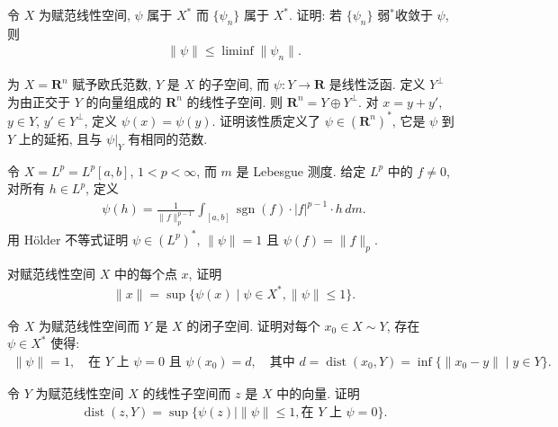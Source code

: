\documentclass[../../main.tex]{subfiles}
\begin{document}
\begin{exercise}\label{exercise:ch14-20}
令 $X$ 为赋范线性空间, $\psi$ 属于 $X^{*}$ 而 $\{\psi_{n}\}$ 属于 $X^{*}$. 证明: 若 $\{\psi_{n}\}$ 弱$^{*}$收敛于 $\psi$, 则
\begin{align*}
\|\psi\|\leqslant\liminf\|\psi_{n}\|.
\end{align*}
\end{exercise}

\begin{exercise}\label{exercise:ch14-21}
为 $X=\mathbf{R}^{n}$ 赋予欧氏范数, $Y$ 是 $X$ 的子空间, 而 $\psi:Y\to\mathbf{R}$ 是线性泛函. 定义 $Y^{\perp}$ 为由正交于 $Y$ 的向量组成的 $\mathbf{R}^{n}$ 的线性子空间. 则 $\mathbf{R}^{n}=Y\oplus Y^{\perp}$. 对 $x=y+y'$, $y\in Y$, $y'\in Y^{\perp}$, 定义 $\psi(x)=\psi(y)$. 证明该性质定义了 $\psi\in(\mathbf{R}^{n})^{*}$, 它是 $\psi$ 到 $Y$ 上的延拓, 且与 $\psi|_{Y}$ 有相同的范数.
\end{exercise}

\begin{exercise}\label{exercise:ch14-22}
令 $X=L^{p}=L^{p}[a,b]$, $1<p<\infty$, 而 $m$ 是 Lebesgue 测度. 给定 $L^{p}$ 中的 $f\neq 0$, 对所有 $h\in L^{p}$, 定义
\begin{align*}
\psi(h)=\frac{1}{\|f\|_{p}^{p-1}}\int_{[a,b]}\operatorname{sgn}(f)\cdot|f|^{p-1}\cdot h\,dm.
\end{align*}
用 Hölder 不等式证明 $\psi\in(L^{p})^{*}$, $\|\psi\|=1$ 且 $\psi(f)=\|f\|_{p}$.
\end{exercise}

\begin{exercise}\label{exercise:ch14-23}
对赋范线性空间 $X$ 中的每个点 $x$, 证明
\begin{align*}
\|x\|=\sup\{\psi(x)\mid\psi\in X^{*},\|\psi\|\leqslant 1\}.
\end{align*}
\end{exercise}

\begin{exercise}\label{exercise:ch14-24}
令 $X$ 为赋范线性空间而 $Y$ 是 $X$ 的闭子空间. 证明对每个 $x_{0}\in X\sim Y$, 存在 $\psi\in X^{*}$ 使得:
\begin{align*}
\|\psi\|=1,\quad\text{在 }Y\text{ 上 }\psi=0\text{ 且 }\psi(x_{0})=d,\quad\text{其中 }d=\operatorname{dist}(x_{0},Y)=\inf\{\|x_{0}-y\|\mid y\in Y\}.
\end{align*}
\end{exercise}

\begin{exercise}\label{exercise:ch14-25}
令 $Y$ 为赋范线性空间 $X$ 的线性子空间而 $z$ 是 $X$ 中的向量. 证明
\begin{align*}
\operatorname{dist}(z,Y)=\sup\{\psi(z)\mid\|\psi\|\leqslant 1,\text{在 }Y\text{ 上 }\psi=0\}.
\end{align*}
\end{exercise}
\end{document}
